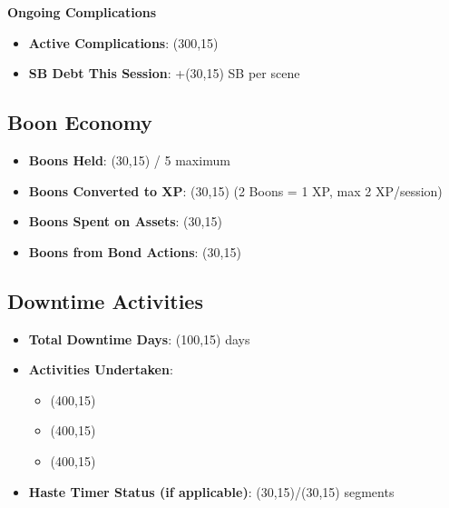 \documentclass[11pt,letterpaper]{article}
\begin{document}
\vspace{0.3cm}

\noindent\textbf{Ongoing Complications}
\begin{itemize}[leftmargin=*]
    \item \textbf{Active Complications}: \framebox(300,15){}
    \item \textbf{SB Debt This Session}: +\framebox(30,15){} SB per scene
\end{itemize}

\subsection{Boon Economy}

\begin{itemize}[leftmargin=*]
    \item \textbf{Boons Held}: \framebox(30,15){} / 5 maximum
    \item \textbf{Boons Converted to XP}: \framebox(30,15){} (2 Boons = 1 XP, max 2 XP/session)
    \item \textbf{Boons Spent on Assets}: \framebox(30,15){}
    \item \textbf{Boons from Bond Actions}: \framebox(30,15){}
\end{itemize}

\subsection{Downtime Activities}

\begin{itemize}[leftmargin=*]
    \item \textbf{Total Downtime Days}: \framebox(100,15){} days
    \item \textbf{Activities Undertaken}: 
    \begin{itemize}
        \item \framebox(400,15){}
        \item \framebox(400,15){}
        \item \framebox(400,15){}
    \end{itemize}
    \item \textbf{Haste Timer Status (if applicable)}: \framebox(30,15){}/\framebox(30,15){} segments
\end{itemize}
\end{document}

